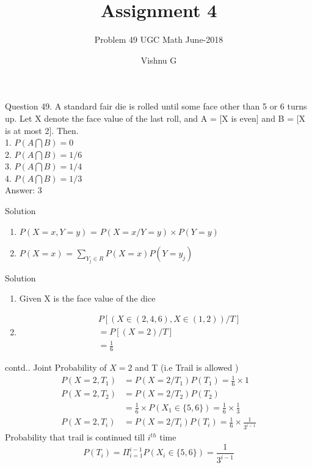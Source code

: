 \documentclass[10pt]{beamer}
\title{Assignment 4}
\subtitle{Problem 49 UGC Math June-2018}
\date{}
\author{Vishnu G}
\institute{Indian Institute of Technology Hyderabad}
\begin{document}
\maketitle

\begin{frame}[fragile]{Question}
49. A standard fair die is rolled until some face other than 5 or 6 turns up. Let X denote the face value of the last roll, and A = [X is even] and B = [X is at most 2]. Then.\\
1. $P(A \bigcap B) = 0$ \\
2. $P(A \bigcap B) = 1/6$ \\
3. $P(A \bigcap B) = 1/4$ \\ 
4. $P(A \bigcap B) = 1/3$ \\

Answer: 3
\end{frame}
\begin{frame}{Solution}
\begin{enumerate}
    \item $P(X=x,Y=y)$ = $P(X=x/Y=y) \times P(Y=y)$
    \item $P(X=x)$ = $\sum_{Y_j\in R} P(X=x) P(Y=y_j)$  
\end{enumerate}
\end{frame}

\begin{frame}{Solution}
\begin{enumerate}
    \item Given X is the face value of the dice\\
\item 
\begin{align*}
&  P[(X \in (2,4,6), X \in (1,2))/T] \\
&= P[(X = 2)/T] \\
&= \frac{1}{6} 
\end{align*}
\end{enumerate}
\end{frame}

\begin{frame}{contd..}
Joint Probability of $X=2$ and T (i.e Trail is allowed )
\begin{align*}
P(X=2,T_1) &= P(X=2/T_1)  P(T_1) = \frac{1}{6} \times 1 \\
P(X=2,T_2) &= P(X=2/T_2)  P(T_2) \\
           &=\frac{1}{6} \times P(X_1 \in \{5,6\} ) = \frac{1}{6} \times \frac{1}{3}\\
P(X=2,T_i) &= P(X=2/T_i) P(T_i) = \frac{1}{6} \times \frac{1}{3^{i-1}}
\end{align*}
Probability that trail is continued till $i^{th}$ time 
\begin{equation*}
    P(T_i) = \Pi_{i=1}^{i-1} P(X_i \in \{5,6\})= \frac{1}{3^{i-1}}
\end{equation*}
\end{frame}
\end{document}
